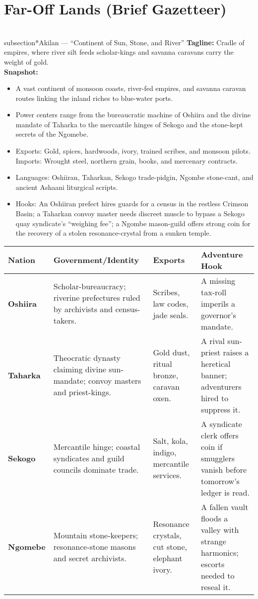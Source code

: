 \documentclass[11pt]{article}
\begin{document}
\section{Far-Off Lands (Brief Gazetteer)}

\\subsection*{Akilan — “Continent of Sun, Stone, and River”}
\textbf{Tagline:} Cradle of empires, where river silt feeds scholar-kings and savanna caravans carry the weight of gold.\\
\textbf{Snapshot:}
\begin{itemize}
  \item A vast continent of monsoon coasts, river-fed empires, and savanna caravan routes linking the inland riches to blue-water ports.
  \item Power centers range from the bureaucratic machine of Oshiira and the divine mandate of Taharka to the mercantile hinges of Sekogo and the stone-kept secrets of the Ngomebe.
  \item Exports: Gold, spices, hardwoods, ivory, trained scribes, and monsoon pilots. Imports: Wrought steel, northern grain, books, and mercenary contracts.
  \item Languages: Oshiiran, Taharkan, Sekogo trade-pidgin, Ngombe stone-cant, and ancient Ashaani liturgical scripts.
  \item Hooks: An Oshiiran prefect hires guards for a census in the restless Crimson Basin; a Taharkan convoy master needs discreet muscle to bypass a Sekogo quay syndicate's ``weighing fee''; a Ngombe mason-guild offers strong coin for the recovery of a stolen resonance-crystal from a sunken temple.
\end{itemize}

\begin{center}
\begin{tabular}{|p{3cm}|p{3.5cm}|p{3.5cm}|p{5.5cm}|}
\hline
\textbf{Nation} & \textbf{Government/Identity} & \textbf{Exports} & \textbf{Adventure Hook} \\
\hline
\textbf{Oshiira} & Scholar-bureaucracy; riverine prefectures ruled by archivists and census-takers. & Scribes, law codes, jade seals. & A missing tax-roll imperils a governor’s mandate. \\
\hline
\textbf{Taharka} & Theocratic dynasty claiming divine sun-mandate; convoy masters and priest-kings. & Gold dust, ritual bronze, caravan oxen. & A rival sun-priest raises a heretical banner; adventurers hired to suppress it. \\
\hline
\textbf{Sekogo} & Mercantile hinge; coastal syndicates and guild councils dominate trade. & Salt, kola, indigo, mercantile services. & A syndicate clerk offers coin if smugglers vanish before tomorrow’s ledger is read. \\
\hline
\textbf{Ngomebe} & Mountain stone-keepers; resonance-stone masons and secret archivists. & Resonance crystals, cut stone, elephant ivory. & A fallen vault floods a valley with strange harmonics; escorts needed to reseal it. \\
\hline
\end{tabular}
\end{center}
\end{document}
